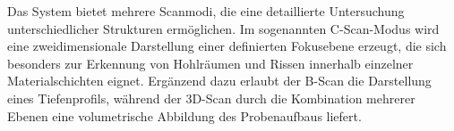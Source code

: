 Das System bietet mehrere Scanmodi, die eine detaillierte Untersuchung unterschiedlicher Strukturen ermöglichen. Im sogenannten C-Scan-Modus wird eine zweidimensionale Darstellung einer definierten Fokusebene erzeugt, die sich besonders zur Erkennung von Hohlräumen und Rissen innerhalb einzelner Materialschichten eignet. Ergänzend dazu erlaubt der B-Scan die Darstellung eines Tiefenprofils, während der 3D-Scan durch die Kombination mehrerer Ebenen eine volumetrische Abbildung des Probenaufbaus liefert.




